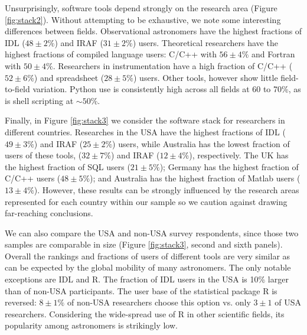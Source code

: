 Unsurprisingly, software tools depend strongly on the research area (Figure \ref{fig:stack2}). Without attempting to be exhaustive, we note some interesting differences between fields. Observational astronomers have the highest fractions of IDL ($48\pm2\%$) and IRAF ($31\pm2\%$) users. Theoretical researchers have the highest fractions of compiled language users: C/C++ with $56\pm4\%$ and Fortran with $50\pm4\%$. Researchers in instrumentation have a high fraction of C/C++ ($52\pm6\%$) and spreadsheet ($28\pm5\%$) users. Other tools, however show little field-to-field variation. Python use is consistently high across all fields at 60 to 70\%, as is shell scripting at $\sim50\%$. 

Finally, in Figure \ref{fig:stack3} we consider the software stack for researchers in different countries. Researches in the USA have the highest fractions of IDL ($49\pm3\%$) and IRAF ($25\pm2\%$) users, while Australia has the lowest fraction of users of these tools, ($32\pm7\%$) and IRAF ($12\pm4\%$), respectively. The UK has the highest fraction of SQL users ($21\pm5\%$); Germany has the highest fraction of C/C++ users ($48\pm5\%$); and Australia has the highest fraction of Matlab users ($13\pm4\%$). However, these results can be strongly influenced by the research areas represented for each country within our sample so we caution against drawing far-reaching conclusions. 

We can also compare the USA and non-USA survey respondents, since those two samples are comparable in size (Figure \ref{fig:stack3}, second and sixth panels). Overall the rankings and fractions of users of different tools are very similar as can be expected by the global mobility of many astronomers. The only notable exceptions are IDL and R. The fraction of IDL users in the USA is 10\% larger than of non-USA participants. The user base of the statistical package R is reversed:  $8\pm1\%$ of non-USA researchers choose this option vs. only $3\pm1$ of USA researchers. Considering the wide-spread use of R in other scientific fields, its popularity among astronomers is strikingly low.
    
  
